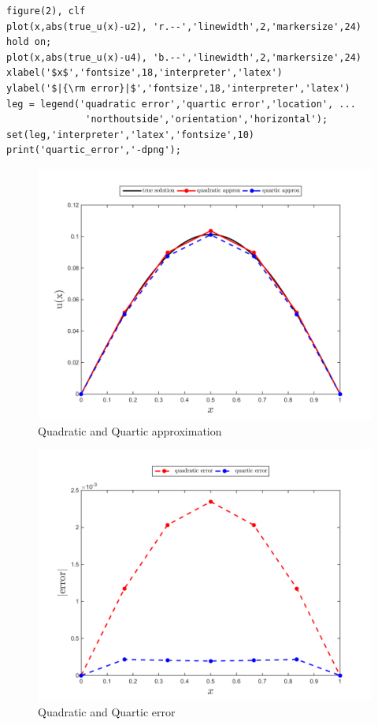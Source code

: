 \documentclass[14pt,a4paper]{article}
\begin{document}
\begin{enumerate}
\begin{lstlisting}
figure(2), clf
plot(x,abs(true_u(x)-u2), 'r.--','linewidth',2,'markersize',24)
hold on;
plot(x,abs(true_u(x)-u4), 'b.--','linewidth',2,'markersize',24)
xlabel('$x$','fontsize',18,'interpreter','latex')
ylabel('$|{\rm error}|$','fontsize',18,'interpreter','latex')
leg = legend('quadratic error','quartic error','location', ...
			  'northoutside','orientation','horizontal');
set(leg,'interpreter','latex','fontsize',10)
print('quartic_error','-dpng');
	\end{lstlisting}
	\pagebreak
	\begin{figure}[htp]
		\begin{center}
			\includegraphics[scale=0.52]{quartic_approx.png}
			\caption{Quadratic and Quartic approximation}
		\end{center}
	\end{figure}
	\begin{figure}[htp]
		\begin{center}
			\includegraphics[scale=0.52]{quartic_error.png}
			\caption{Quadratic and Quartic error}
		\end{center}
	\end{figure}
	

\end{enumerate}
\end{document}
